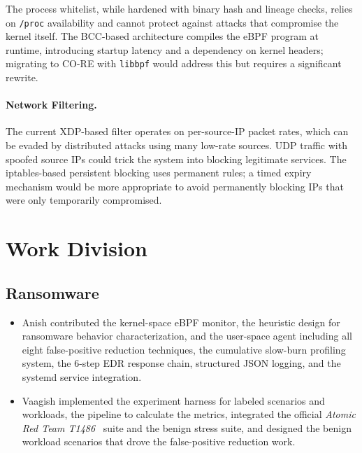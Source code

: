 \documentclass[twocolumn, 10pt]{scrartcl}
\begin{document}
The process whitelist, while hardened with binary hash and lineage checks, relies on \texttt{/proc} availability and cannot protect against attacks that compromise the kernel itself. The BCC-based architecture compiles the eBPF program at runtime, introducing startup latency and a dependency on kernel headers; migrating to CO-RE with \texttt{libbpf} would address this but requires a significant rewrite.

\paragraph{Network Filtering.}
The current XDP-based filter operates on per-source-IP packet rates, which can be evaded by distributed attacks using many low-rate sources. UDP traffic with spoofed source IPs could trick the system into blocking legitimate services. The iptables-based persistent blocking uses permanent rules; a timed expiry mechanism would be more appropriate to avoid permanently blocking IPs that were only temporarily compromised.
\section{Work Division}

\subsection{Ransomware}
\begin{itemize}
    \item Anish contributed the kernel-space eBPF monitor, the heuristic design for ransomware behavior characterization, and the user-space agent including all eight false-positive reduction techniques, the cumulative slow-burn profiling system, the 6-step EDR response chain, structured JSON logging, and the systemd service integration. 
    \item  Vaagish implemented the experiment harness for labeled scenarios and workloads, the pipeline to calculate the metrics, integrated the official \emph{Atomic Red Team T1486}~\cite{atomic_red_team_T1486} suite and the benign stress suite, and designed the benign workload scenarios that drove the false-positive reduction work.
\end{itemize}
\end{document}
